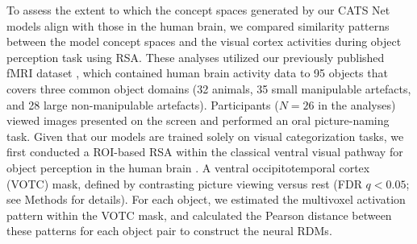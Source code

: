 \documentclass[pdflatex,sn-mathphys-num,lineno]{sn-jnl}%
\begin{document}
\begin{CJK}{UTF8}{gbsn}
To assess the extent to which the concept spaces generated by our CATS Net models align with those in the human brain, we compared similarity patterns between the model concept spaces and the visual cortex activities during object perception task using RSA. These analyses utilized our previously published fMRI dataset \cite{fu_different_2022}, which contained human brain activity data to 95 objects that covers three common object domains (32 animals, 35 small manipulable artefacts, and 28 large non-manipulable artefacts). Participants ($N=26$ in the analyses) viewed images presented on the screen and performed an oral picture-naming task. Given that our models are trained solely on visual categorization tasks, we first conducted a ROI-based RSA within the classical ventral visual pathway for object perception in the human brain \cite{ungerleider_what_1994}. A ventral occipitotemporal cortex (VOTC) mask, defined by contrasting picture viewing versus rest (FDR $q < 0.05$; see Methods for details). For each object, we estimated the multivoxel activation pattern within the VOTC mask, and calculated the Pearson distance between these patterns for each object pair to construct the neural RDMs. 


\end{CJK}
\end{document}
